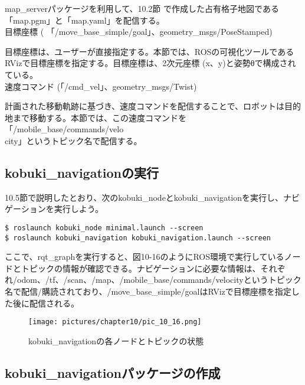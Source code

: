 map\_serverパッケージを利用して、10.2節  で作成した占有格子地図である「map.pgm」と「map.yaml」を配信する。\\

\circled{\thenum} 目標座標 ( 「/move\_base\_simple/goal」、geometry\_msgs/PoseStamped)

目標座標は、ユーザーが直接指定する。本節では、ROSの可視化ツールであるRVizで目標座標を指定する。目標座標は、2次元座標 (x、y)と姿勢θで構成されている。\\

\circled{\thenum} 速度コマンド (「/cmd\_vel」、geometry\_msgs/Twist)

計画された移動軌跡に基づき、速度コマンドを配信することで、ロボットは目的地まで移動する。本節では、この速度コマンドを「/mobile\_base/commands/velo\\city」というトピック名で配信する。\\

\subsection{kobuki\_navigationの実行}

10.5節で説明したとおり、次のkobuki\_nodeとkobuki\_navigationを実行し、ナビゲーションを実行しよう。

\begin{lstlisting}[language=ROS]
$ roslaunch kobuki_node minimal.launch --screen
$ roslaunch kobuki_navigation kobuki_navigation.launch --screen
\end{lstlisting}

ここで、rqt\_graphを実行すると、図10-16のようにROS環境で実行しているノードとトピックの情報が確認できる。ナビゲーションに必要な情報は、それぞれ/odom、/tf、/scan、/map、/mobile\_base/commands/velocityというトピック名で配信/購読されており、/move\_base\_simple/goalはRVizで目標座標を指定した後に配信される。

\begin{figure}[htp]
  \centering
  \texttt{[image: pictures/chapter10/pic\_10\_16.png]}
  \caption{kobuki\_navigationの各ノードとトピックの状態}
\end{figure}

\subsection{kobuki\_navigationパッケージの作成}

